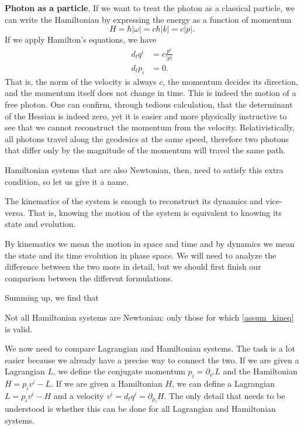 \textbf{Photon as a particle}. If we want to treat the photon as a classical particle, we can write the Hamiltonian by expressing the energy as a function of momentum
\begin{equation}
	H=\hbar | \omega| = c \hbar |k| = c |p|.
\end{equation}
If we apply Hamilton's equations, we have
\begin{equation}
	\begin{aligned}
		d_t q^i &= c \frac{p^i}{|p|} \\
		d_t p_i &= 0.
	\end{aligned}
\end{equation}
That is, the norm of the velocity is always $c$, the momentum decides its direction, and the momentum itself does not change in time. This is indeed the motion of a free photon. One can confirm, through tedious calculation, that the determinant of the Hessian is indeed zero, yet it is easier and more physically instructive to see that we cannot reconstruct the momentum from the velocity. Relativistically, all photons travel along the geodesics at the same speed, therefore two photons that differ only by the magnitude of the momentum will travel the same path.

Hamiltonian systems that are also Newtonian, then, need to satisfy this extra condition, so let us give it a name.
\renewcommand{\theassump}{KE}%
\begin{assump}\label{assum_kineq}
	The kinematics of the system is enough to reconstruct its dynamics and vice-versa. That is, knowing the motion of the system is equivalent to knowing its state and evolution.
\end{assump}
\renewcommand{\theassump}{\Roman{assump}}%
By kinematics we mean the motion in space and time and by dynamics we mean the state and its time evolution in phase space. We will need to analyze the difference between the two more in detail, but we should first finish our comparison between the different formulations.

Summing up, we find that
\begin{insight}
	Not all Hamiltonian systems are Newtonian: only those for which  \ref{assum_kineq} is valid.
\end{insight}


We now need to compare Lagrangian and Hamiltonian systems. The task is a lot easier because we already have a precise way to connect the two. If we are given a Lagrangian $L$, we define the conjugate momentum $p_i = \partial_{v^i} L$ and the Hamiltonian $H = p_i v^i - L$. If we are given a Hamiltonian $H$, we can define a Lagrangian $L = p_i v^i - H$ and a velocity $v^i = d_t q^i = \partial_{p_i} H$. The only detail that needs to be understood is whether this can be done for all Lagrangian and Hamiltonian systems.


